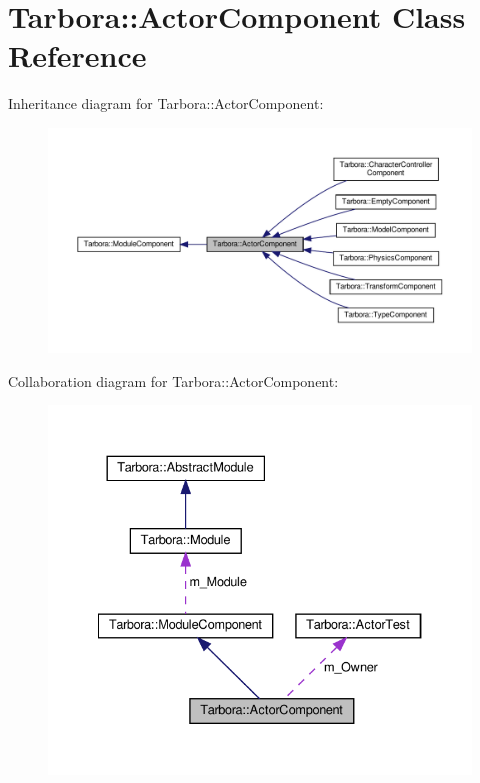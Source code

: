 \hypertarget{classTarbora_1_1ActorComponent}{}\section{Tarbora\+:\+:Actor\+Component Class Reference}
\label{classTarbora_1_1ActorComponent}


Inheritance diagram for Tarbora\+:\+:Actor\+Component\+:
\nopagebreak
\begin{figure}[H]
\begin{center}
\leavevmode
\includegraphics[width=350pt]{classTarbora_1_1ActorComponent__inherit__graph}
\end{center}
\end{figure}


Collaboration diagram for Tarbora\+:\+:Actor\+Component\+:
\nopagebreak
\begin{figure}[H]
\begin{center}
\leavevmode
\includegraphics[width=334pt]{classTarbora_1_1ActorComponent__coll__graph}
\end{center}
\end{figure}
